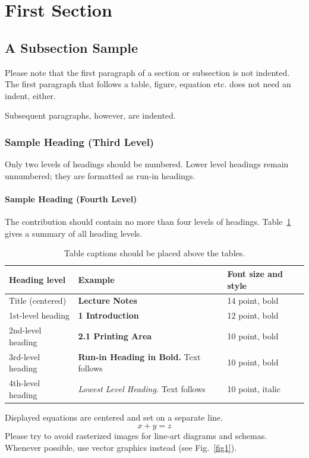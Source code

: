\documentclass{llncs}
\begin{document}
\vspace{0.5cm}
\setcounter{page}{1}

%
\section{First Section}
\subsection{A Subsection Sample}
Please note that the first paragraph of a section or subsection is
not indented. The first paragraph that follows a table, figure,
equation etc. does not need an indent, either.

Subsequent paragraphs, however, are indented.

\subsubsection{Sample Heading (Third Level)} Only two levels of
headings should be numbered. Lower level headings remain unnumbered;
they are formatted as run-in headings.

\paragraph{Sample Heading (Fourth Level)}
The contribution should contain no more than four levels of
headings. Table~\ref{tab1} gives a summary of all heading levels.

\begin{table}
\caption{Table captions should be placed above the
tables.}\label{tab1}
\begin{tabular}{|l|l|l|}
\hline
Heading level &  Example & Font size and style\\
\hline
Title (centered) &  {\Large\bfseries Lecture Notes} & 14 point, bold\\
1st-level heading &  {\large\bfseries 1 Introduction} & 12 point, bold\\
2nd-level heading & {\bfseries 2.1 Printing Area} & 10 point, bold\\
3rd-level heading & {\bfseries Run-in Heading in Bold.} Text follows & 10 point, bold\\
4th-level heading & {\itshape Lowest Level Heading.} Text follows & 10 point, italic\\
\hline
\end{tabular}
\end{table}


\noindent Displayed equations are centered and set on a separate
line.
\begin{equation}
x + y = z
\end{equation}
Please try to avoid rasterized images for line-art diagrams and
schemas. Whenever possible, use vector graphics instead (see
Fig.~\ref{fig1}).
\end{document}
